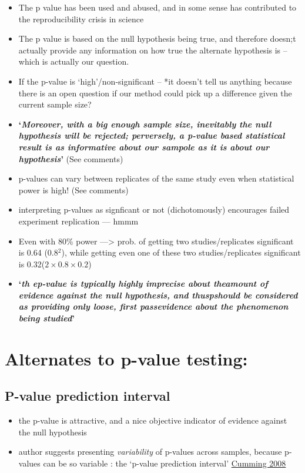 \documentclass[
]{book}
\providecommand{\tightlist}{%
  \setlength{\itemsep}{0pt}\setlength{\parskip}{0pt}}
\begin{document}
\begin{itemize}
\item
  The p value has been used and abused, and in some sense has contributed to the reproducibility crisis in science
\item
  The p value is based on the null hypothesis being true, and therefore doesn;t actually provide any information on how true the alternate hypothesis is -- which is actually our question.
\item
  If the p-value is `high'/non-significant -- *it doesn't tell us anything because there is an open question if our method could pick up a difference given the current sample size?
\item
  \textbf{`\emph{Moreover, with a big enough sample size, inevitably the null hypothesis will be rejected; perversely, a p-value based statistical result is as informative about our sampole as it is about our hypothesis}'} (See comments)
\item
  p-values can vary between replicates of the same study even when statistical power is high! (See comments)
\item
  interpreting p-values as signficant or not (dichotomously) encourages failed experiment replication --- hmmm
\item
  Even with 80\% power ---\textgreater{} prob. of getting two studies/replicates significant is 0.64 (0.8\(^{2}\)), while getting even one of these two studies/replicates significant is 0.32(\(2\times0.8\times0.2\))
\item
  \textbf{`\emph{th ep-value is typically highly imprecise about theamount of evidence against the null hypothesis, and thuspshould be considered as providing only loose, first passevidence about the phenomenon being studied}'}
\end{itemize}

\hypertarget{alternates-to-p-value-testing}{%
\section{Alternates to p-value testing:}\label{alternates-to-p-value-testing}}

\hypertarget{p-value-prediction-interval}{%
\subsection{P-value prediction interval}\label{p-value-prediction-interval}}

\begin{itemize}
\tightlist
\item
  the p-value is attractive, and a nice objective indicator of evidence against the null hypothesis
\item
  author suggests presenting \emph{variability} of p-values across samples, because p-values can be so variable : the `p-value prediction interval' \href{http://methods.sagepub.com/journal-article/sage-quantitative-research-methods/replication_and_p_intervals_p_values_predict_the_future_only_vaguely_but_confidence_intervals_do_much_better/d36.xml}{Cumming 2008}
\end{itemize}
\end{document}
